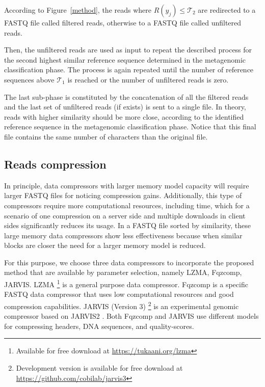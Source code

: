 \documentclass[smallabstract,smallcaptions]{dccpaper}
\begin{document}
According to Figure~\ref{method}, the reads where $R(y_j) \leq \mathcal{T}_2$ are redirected to a FASTQ file called filtered reads, otherwise to a FASTQ file called unfiltered reads. 

Then, the unfiltered reads are used as input to repeat the described process for the second highest similar reference sequence determined in the metagenomic classification phase. The process is again repeated until the number of reference sequences above $\mathcal{T}_1$ is reached or the number of unfiltered reads is zero.

The last sub-phase is constituted by the concatenation of all the filtered reads and the last set of unfiltered reads (if exists) is sent to a single file. In theory, reads with higher similarity should be more close, according to the identified reference sequence in the metagenomic classification phase. Notice that this final file contains the same number of characters than the original file.

\subsection*{Reads compression}

In principle, data compressors with larger memory model capacity will require larger FASTQ files for noticing compression gains. Additionally, this type of compressors require more computational resources, including time, which for a scenario of one compression on a server side and multiple downloads in client sides significantly reduces its usage. In a FASTQ file sorted by similarity, these large memory data compressors show less effectiveness because when similar blocks are closer the need for a larger memory model is reduced.

For this purpose, we choose three data compressors to incorporate the proposed method that are available by parameter selection, namely LZMA, Fqzcomp, JARVIS. LZMA \footnote{Available for free download at \url{https://tukaani.org/lzma}} is a general purpose data compressor. Fqzcomp \cite{bonfield2013compression} is a specific FASTQ data compressor that uses low computational resources and good compression capabilities. JARVIS (Version 3) \footnote{Development version is available for free download at \url{https://github.com/cobilab/jarvis3}} is an experimental genomic compressor based on JARVIS2 \cite{pratas2023jarvis2}. Both Fqzcomp and JARVIS use different models for compressing headers, DNA sequences, and quality-scores. 
\end{document}
